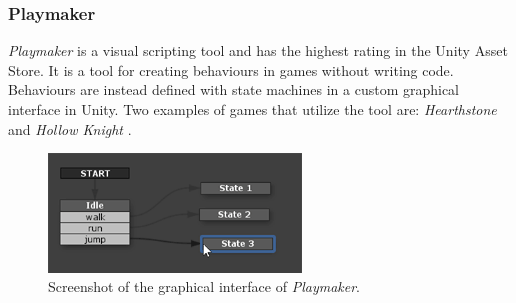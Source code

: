 \subsubsection{Playmaker}
\textit{Playmaker} is a visual scripting tool and has the highest rating in the Unity Asset Store. It is a tool for creating behaviours in games without writing code. Behaviours are instead defined with state machines in a custom graphical interface in Unity. Two examples of games that utilize the tool are: \textit{Hearthstone} and \textit{Hollow Knight} \cite{unity-hutong-playmaker}.

\begin{figure}[H]
    \centering
    \includegraphics[width = 0.6\textwidth]{Planning report/images/playmaker-example.png}
    \caption{Screenshot of the graphical interface of \textit{Playmaker}.}
    \label{fig:playmaker-editor}
\end{figure}

